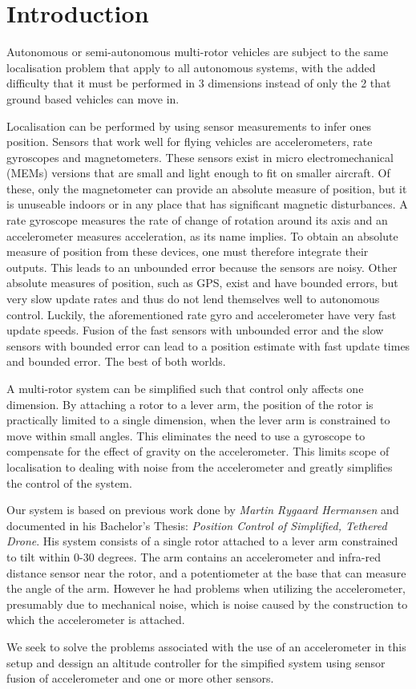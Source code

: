 \section*{Introduction}

Autonomous or semi-autonomous multi-rotor vehicles are subject to the 
same localisation problem that apply to all autonomous systems, with the added
difficulty that it must be performed in 3 dimensions instead of only 
the 2 that ground based vehicles can move in. 

Localisation can be performed by using sensor measurements to infer
ones position. Sensors that work well for flying vehicles are accelerometers,
rate gyroscopes and magnetometers. These sensors exist in micro electromechanical
(MEMs) versions that are small and light enough to fit on smaller aircraft.
Of these, only the magnetometer can provide
an absolute measure of position, but it is unuseable indoors or in any place
that has significant magnetic disturbances. A rate gyroscope measures the
rate of change of rotation around its axis and an accelerometer measures
acceleration, as its name implies. To obtain an absolute measure of position
from these devices, one must therefore integrate their outputs. This leads
to an unbounded error because the sensors are noisy. Other absolute measures 
of position, such as GPS, exist and have bounded errors, but very slow update
rates and thus do not lend themselves well to autonomous control. Luckily,
the aforementioned rate gyro and accelerometer have very fast update speeds.
Fusion of the fast sensors with unbounded error and the slow sensors with bounded
error can lead to a position estimate with fast update times and bounded error.
The best of both worlds.

A multi-rotor system can be simplified such that control only affects one dimension.
By attaching a rotor to a lever arm, the position of the rotor is practically limited
to a single dimension, when the lever arm is constrained to move within small angles.
This eliminates the need to use a gyroscope to compensate for the effect of gravity
on the accelerometer. This limits scope of localisation to dealing with noise
from the accelerometer and greatly simplifies the control of the system.

Our system is based on previous work done by \emph{Martin Rygaard Hermansen} and documented in his Bachelor's Thesis: \emph{Position Control of Simplified, Tethered Drone}. His system consists of a single rotor attached
to a lever arm constrained to tilt within 0-30 degrees. The arm contains an accelerometer
and infra-red distance sensor near the rotor, and a potentiometer at the base that can measure the angle of the arm. 
However he had problems when utilizing the accelerometer, presumably due to mechanical noise, which is noise caused by the construction to which the accelerometer is attached.

We seek to solve the problems associated with the use of an accelerometer in this setup and dessign an altitude controller for the simpified system using sensor fusion of accelerometer and one or more other sensors.
